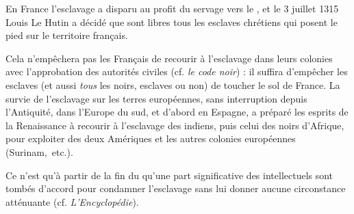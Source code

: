  En France l'esclavage a disparu au profit du servage vers le , et le 3 juillet 1315 Louis Le Hutin a décidé que sont libres tous les esclaves chrétiens qui posent le pied sur le territoire français. 

 Cela n'empêchera pas les Français de recourir à l'esclavage dans leurs colonies avec l'approbation des autorités civiles (cf. \emph{le code noir}) : il suffira d'empêcher les esclaves (et aussi \emph{tous} les noirs, esclaves ou non) de toucher le sol de France. La survie de l'esclavage sur les terres européennes, sans interruption depuis l'Antiquité, dans l'Europe du sud, et d'abord en Espagne, a préparé les esprits de la Renaissance à recourir  à l'esclavage des indiens, puis celui des noirs d'Afrique, pour exploiter des deux Amériques et les autres colonies européennes (Surinam,~etc.). 

 Ce n'est qu'à partir de la fin du  qu'une part significative des intellectuels sont tombés d'accord pour condamner l'esclavage sans lui donner aucune circonstance atténuante (cf. \emph{L'Encyclopédie}).
 



